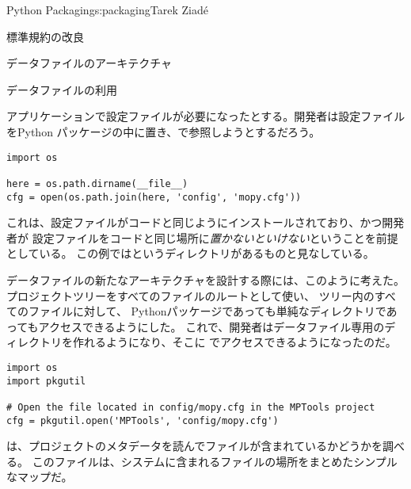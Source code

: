 \begin{aosachapter}{Python Packaging}{s:packaging}{Tarek Ziad\'{e}}
\begin{aosasect1}{標準規約の改良}
\begin{aosasect2}{データファイルのアーキテクチャ}
\begin{aosasect3}{データファイルの利用}

アプリケーションで設定ファイルが必要になったとする。開発者は設定ファイルをPython
パッケージの中に置き、で参照しようとするだろう。

\begin{verbatim}
import os

here = os.path.dirname(__file__)
cfg = open(os.path.join(here, 'config', 'mopy.cfg'))
\end{verbatim}

\noindent
これは、設定ファイルがコードと同じようにインストールされており、かつ開発者が
設定ファイルをコードと同じ場所に\emph{置かないといけない}ということを前提としている。
この例ではというディレクトリがあるものと見なしている。

データファイルの新たなアーキテクチャを設計する際には、このように考えた。
プロジェクトツリーをすべてのファイルのルートとして使い、
ツリー内のすべてのファイルに対して、
Pythonパッケージであっても単純なディレクトリであってもアクセスできるようにした。
これで、開発者はデータファイル専用のディレクトリを作れるようになり、そこに
でアクセスできるようになったのだ。

\begin{verbatim}
import os
import pkgutil

# Open the file located in config/mopy.cfg in the MPTools project
cfg = pkgutil.open('MPTools', 'config/mopy.cfg')
\end{verbatim}

\noindent
{}は、プロジェクトのメタデータを読んでファイルが含まれているかどうかを調べる。
このファイルは、システムに含まれるファイルの場所をまとめたシンプルなマップだ。


\end{aosasect3}
\end{aosasect2}
\end{aosasect1}
\end{aosachapter}
